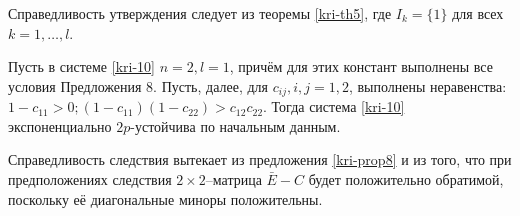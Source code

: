 Справедливость утверждения следует из теоремы \ref{kri-th5}, где $I_k = \{1\}$
для всех $k = 1, \dots, l$.

\begin{corollary}\label{kri-cor2}
 Пусть в системе \eqref{kri-10} $n = 2, l =1$, причём для этих констант выполнены все условия Предложения 8. Пусть, далее, для $c_{ij}, i,j = 1, 2$, выполнены неравенства: $ 1 - c_{11} > 0; (1 - c_{11})(1 - c_{22}) > c_{12}c_{22}$. Тогда система \eqref{kri-10}
экспоненциально $2p$-устойчива по начальным данным.
\end{corollary}

Справедливость следствия вытекает из предложения \ref{kri-prop8} и из того, что при
предположениях следствия $2\times 2$--матрица $\bar E - C$ будет
положительно обратимой, поскольку её диагональные миноры
положительны.






%
